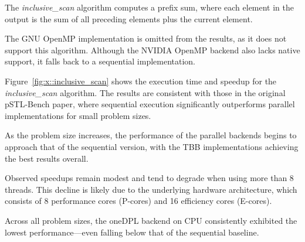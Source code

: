 \documentclass[sigconf]{acmart}
\begin{document}
The \textit{inclusive\_scan} algorithm computes a prefix sum, where each
element in the output is the sum of all preceding elements plus the current
element.

The GNU OpenMP implementation is omitted from the results, as it does not
support this algorithm. Although the NVIDIA OpenMP backend also lacks native
support, it falls back to a sequential implementation.

Figure~\ref{fig:x::inclusive_scan} shows the execution time and speedup for the
\textit{inclusive\_scan} algorithm. The results are consistent with those in
the original pSTL-Bench paper, where sequential execution significantly
outperforms parallel implementations for small problem sizes.

As the problem size increases, the performance of the parallel backends begins
to approach that of the sequential version, with the TBB implementations
achieving the best results overall.

Observed speedups remain modest and tend to degrade when using more than 8
threads. This decline is likely due to the underlying hardware architecture,
which consists of 8 performance cores (P-cores) and 16 efficiency cores
(E-cores).

Across all problem sizes, the oneDPL backend on CPU consistently exhibited the
lowest performance—even falling below that of the sequential baseline.
\end{document}
